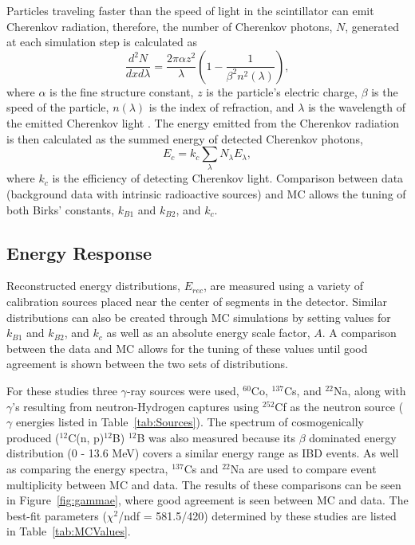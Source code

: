 Particles traveling faster than the speed of light in the scintillator can emit Cherenkov radiation, therefore, the number of Cherenkov photons, $N$, generated at each simulation step is calculated as
\begin{equation}
	\frac{d^2N}{dxd\lambda} = \frac{2\pi \alpha z^2}{\lambda}\left(1-\frac{1}{\beta^2n^2(\lambda)}\right),
\end{equation}
where $\alpha$ is the fine structure constant, $z$ is the particle's electric charge, $\beta$ is the speed of the particle, $n(\lambda)$ is the index of refraction, and $\lambda$ is the wavelength of the emitted Cherenkov light \cite{PDG}.
The energy emitted from the Cherenkov radiation is then calculated as the summed energy of detected Cherenkov photons,
\begin{equation}
	E_c = k_c \sum_{\lambda}N_\lambda E_\lambda,
\end{equation}
where $k_c$ is the efficiency of detecting Cherenkov light. 
Comparison between data (background data with intrinsic radioactive sources) and MC allows the tuning of both Birks' constants, $k_{B1}$ and $k_{B2}$, and $k_c$.

\subsection{Energy Response}

Reconstructed energy distributions, $E_{rec}$, are measured using a variety of calibration sources placed near the center of segments in the detector. 
Similar distributions can also be created through MC simulations by setting values for $k_{B1}$ and $k_{B2}$, and $k_c$ as well as an absolute energy scale factor, $A$.
A comparison between the data and MC allows for the tuning of these values until good agreement is shown between the two sets of distributions.

For these studies three $\gamma$-ray sources were used, $^{60}$Co, $^{137}$Cs, and $^{22}$Na, along with $\gamma$'s resulting from neutron-Hydrogen captures using $^{252}$Cf as the neutron source ($\gamma$ energies listed in Table~\ref{tab:Sources}).
The spectrum of cosmogenically produced ($^{12}$C(n, p)$^{12}$B) $^{12}$B was also measured because its $\beta$ dominated energy distribution  (0 - 13.6 MeV) covers a similar energy range as IBD events.
As well as comparing the energy spectra, $^{137}$Cs and $^{22}$Na are used to compare event multiplicity between MC and data.
The results of these comparisons can be seen in Figure~\ref{fig:gammae}, where good agreement is seen between MC and data.
The best-fit parameters ($\chi^2$/ndf = 581.5/420) determined by these studies are listed in Table~\ref{tab:MCValues}.

